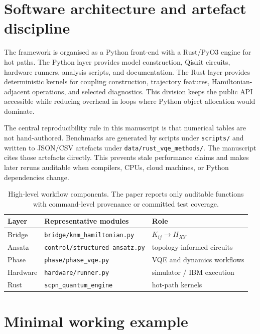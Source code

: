 \documentclass[preprint,aps,physrev,superscriptaddress,floatfix,longbibliography]{revtex4-2}
\begin{document}
\section{Software architecture and artefact discipline}

The framework is organised as a Python front-end with a Rust/PyO3 engine
for hot paths. The Python layer provides model construction, Qiskit
circuits, hardware runners, analysis scripts, and documentation. The Rust
layer provides deterministic kernels for coupling construction, trajectory
features, Hamiltonian-adjacent operations, and selected diagnostics. This
division keeps the public API accessible while reducing overhead in loops
where Python object allocation would dominate.

The central reproducibility rule in this manuscript is that numerical
tables are not hand-authored. Benchmarks are generated by scripts under
\texttt{scripts/} and written to JSON/CSV artefacts under
\texttt{data/rust\_vqe\_methods/}. The manuscript cites those artefacts
directly. This prevents stale performance claims and makes later
reruns auditable when compilers, CPUs, cloud machines, or Python
dependencies change.

\begin{table}[tb]
\centering
\small
\begin{tabular}{lll}
\toprule
Layer & Representative modules & Role \\
\midrule
Bridge & \texttt{bridge/knm\_hamiltonian.py} & $K_{ij}\rightarrow H_{XY}$ \\
Ansatz & \texttt{control/structured\_ansatz.py} & topology-informed circuits \\
Phase & \texttt{phase/phase\_vqe.py} & VQE and dynamics workflows \\
Hardware & \texttt{hardware/runner.py} & simulator / IBM execution \\
Rust & \texttt{scpn\_quantum\_engine} & hot-path kernels \\
\bottomrule
\end{tabular}
\caption{High-level workflow components. The paper reports only
auditable functions with command-level provenance or committed test
coverage.}
\label{tab:architecture}
\end{table}

\section{Minimal working example}
\end{document}
